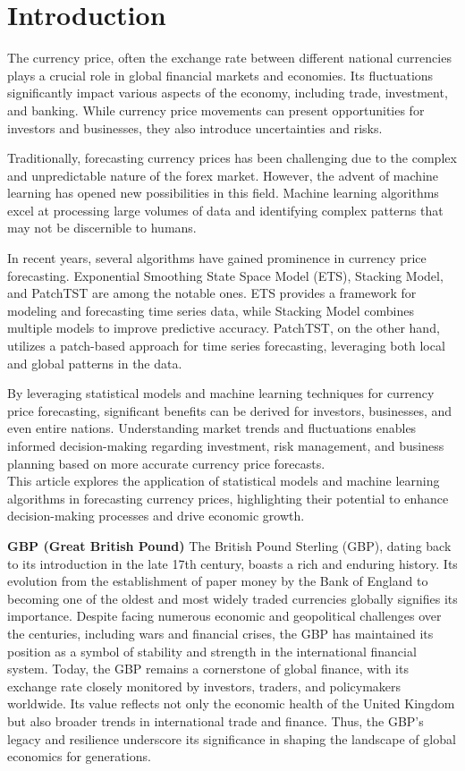 \documentclass{ieeeojies}
\begin{document}
\section{Introduction}
\label{sec:introduction}
The currency price, often the exchange rate between different national currencies plays a crucial role in global financial markets and economies. Its fluctuations significantly impact various aspects of the economy, including trade, investment, and banking. While currency price movements can present opportunities for investors and businesses, they also introduce uncertainties and risks.\par
\noindent
Traditionally, forecasting currency prices has been challenging due to the complex and unpredictable nature of the forex market. However, the advent of machine learning has opened new possibilities in this field. Machine learning algorithms excel at processing large volumes of data and identifying complex patterns that may not be discernible to humans.\par
\noindent
In recent years, several algorithms have gained prominence in currency price forecasting. Exponential Smoothing State Space Model (ETS), Stacking Model, and PatchTST are among the notable ones. ETS provides a framework for modeling and forecasting time series data, while Stacking Model combines multiple models to improve predictive accuracy. PatchTST, on the other hand, utilizes a patch-based approach for time series forecasting, leveraging both local and global patterns in the data.\par
\noindent
By leveraging statistical models and machine learning techniques for currency price forecasting, significant benefits can be derived for investors, businesses, and even entire nations. Understanding market trends and fluctuations enables informed decision-making regarding investment, risk management, and business planning based on more accurate currency price forecasts.\\
\noindent
This article explores the application of statistical models and machine learning algorithms in forecasting currency prices, highlighting their potential to enhance decision-making processes and drive economic growth.

\bigskip
\raggedright\textbf{GBP (Great British Pound)}
\bigskip
\justify
The British Pound Sterling (GBP), dating back to its introduction in the late 17th century, boasts a rich and enduring history. Its evolution from the establishment of paper money by the Bank of England to becoming one of the oldest and most widely traded currencies globally signifies its importance. Despite facing numerous economic and geopolitical challenges over the centuries, including wars and financial crises, the GBP has maintained its position as a symbol of stability and strength in the international financial system. Today, the GBP remains a cornerstone of global finance, with its exchange rate closely monitored by investors, traders, and policymakers worldwide. Its value reflects not only the economic health of the United Kingdom but also broader trends in international trade and finance. Thus, the GBP's legacy and resilience underscore its significance in shaping the landscape of global economics for generations.
\end{document}
